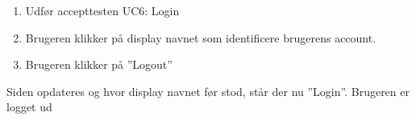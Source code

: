
		{
		\begin{enumerate}
			\item Udfør accepttesten UC6: Login
			\item Brugeren klikker på display navnet som identificere brugerens account.
			\item Brugeren klikker på ''Logout''
		\end{enumerate}
		} %
		{Siden opdateres og hvor display navnet før stod, står der nu ''Login''. Brugeren er logget ud} %
		{} %
		{} %


